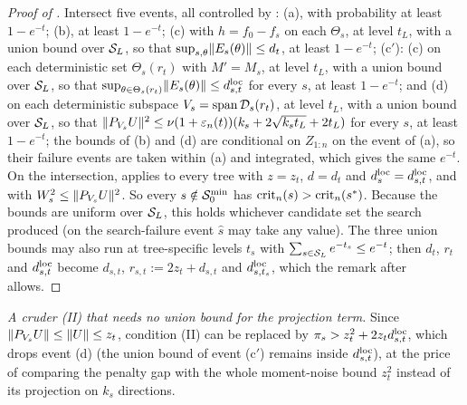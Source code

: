 \begin{proof}[Proof of ]
Intersect five events, all controlled by : (a), with probability at least $1 - e^{-t}$; (b), at least $1 - e^{-t}$; (c) with $h = f_0 - f_s$ on each $\Theta_s$, at level $t_L$, with a union bound over $\mathcal{S}_L$, so that $\sup_{s,\theta}\lVert E_s(\theta)\rVert \le d_t$, at least $1 - e^{-t}$; (c$'$): (c) on each deterministic set $\Theta_s(r_t)$ with $M' = M_s$, at level $t_L$, with a union bound over $\mathcal{S}_L$, so that $\sup_{\theta \in \Theta_s(r_t)}\lVert E_s(\theta)\rVert \le d^{\mathrm{loc}}_{s,t}$ for every $s$, at least $1 - e^{-t}$; and (d) on each deterministic subspace $V_s = \mathrm{span}\,\mathcal{D}_s(r_t)$, at level $t_L$, with a union bound over $\mathcal{S}_L$, so that $\lVert P_{V_s}U\rVert^2 \le \nu(1 + \varepsilon_n(t))(k_s + 2\sqrt{k_st_L} + 2t_L)$ for every $s$, at least $1 - e^{-t}$; the bounds of (b) and (d) are conditional on $Z_{1:n}$ on the event of (a), so their failure events are taken within (a) and integrated, which gives the same $e^{-t}$. On the intersection,  applies to every tree with $z = z_t$, $d = d_t$ and $d^{\mathrm{loc}}_s = d^{\mathrm{loc}}_{s,t}$, and with $W_s^2 \le \lVert P_{V_s}U\rVert^2$. So every $s \notin \mathcal{S}_0^{\min}$ has $\mathrm{crit}_n(s) > \mathrm{crit}_n(s^*)$. Because the bounds are uniform over $\mathcal{S}_L$, this holds whichever candidate set the search produced (on the search-failure event $\hat s$ may take any value). The three union bounds may also run at tree-specific levels $t_s$ with $\sum_{s \in \mathcal{S}_L}e^{-t_s} \le e^{-t}$; then $d_t$, $r_t$ and $d^{\mathrm{loc}}_{s,t}$ become $d_{s,t}$, $r_{s,t} := 2z_t + d_{s,t}$ and $d^{\mathrm{loc}}_{s,t_s}$, which the remark after  allows.
\end{proof}

\medskip\noindent\emph{A cruder (II) that needs no union bound for the projection term.} Since $\lVert P_{V_s}U\rVert \le \lVert U\rVert \le z_t$, condition (II) can be replaced by $\pi_s > z_t^2 + 2z_td^{\mathrm{loc}}_{s,t}$, which drops event (d) (the union bound of event (c$'$) remains inside $d^{\mathrm{loc}}_{s,t}$), at the price of comparing the penalty gap with the whole moment-noise bound $z_t^2$ instead of its projection on $k_s$ directions.

